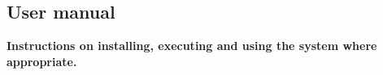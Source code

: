 \documentclass[a4paper,doc,draftfirst]{apa6}
\begin{document}
\subsection{User manual}
\textbf{Instructions on installing, executing and using the system where appropriate.}




\printbibliography
\end{document}
